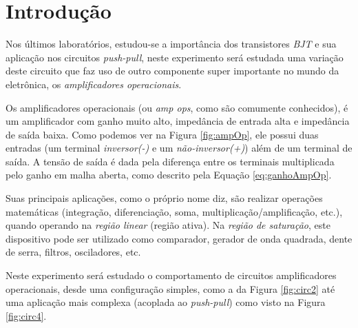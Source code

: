 \section{Introdução} \label{sec:introducao}
    Nos últimos laboratórios, estudou-se a importância dos transistores \emph{BJT} e sua aplicação nos circuitos \emph{push-pull}, neste experimento será estudada uma variação deste circuito que faz uso de outro componente super importante no mundo da eletrônica, os \emph{amplificadores operacionais}.
    
    Os amplificadores operacionais (ou \emph{amp ops}, como são comumente conhecidos), é um amplificador com ganho muito alto, impedância de entrada alta e impedância de saída baixa. Como podemos ver na Figura \ref{fig:ampOp}, ele possui duas entradas (um terminal \emph{inversor(-)} e um \emph{não-inversor(+)}) além de um terminal de saída. A tensão de saída é dada pela diferença entre os terminais multiplicada pelo ganho em malha aberta, como descrito pela Equação \ref{eq:ganhoAmpOp}.
    
    Suas principais aplicações, como o próprio nome diz, são realizar operações matemáticas (integração, diferenciação, soma, multiplicação/amplificação, etc.), quando operando na \emph{região linear} (região ativa). Na \emph{região de saturação}, este dispositivo pode ser utilizado como comparador, gerador de onda quadrada, dente de serra, filtros, osciladores, etc.
    
    Neste experimento será estudado o comportamento de circuitos amplificadores operacionais, desde uma configuração simples, como a da Figura \ref{fig:circ2} até uma aplicação mais complexa (acoplada ao \emph{push-pull}) como visto na Figura \ref{fig:circ4}.